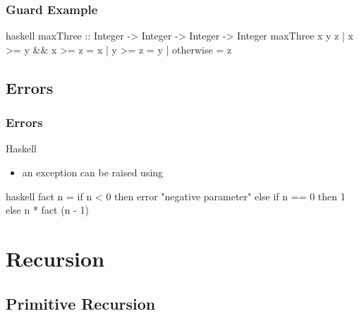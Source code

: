 \documentclass[dvipsnames]{beamer}
\theoremstyle{plain}
\begin{document}
\begin{frame}[fragile]
  \frametitle{Guard Example}

  \begin{exampleblock}{}
    \begin{pygments}{haskell}
maxThree :: Integer -> Integer -> Integer -> Integer
maxThree x y z
  | x >= y && x >= z    = x
  | y >= z              = y
  | otherwise           = z
    \end{pygments}
  \end{exampleblock}
\end{frame}

\subsection{Errors}

\begin{frame}[fragile]
  \frametitle{Errors}

  \begin{block}{Haskell}
    \begin{itemize}
      \item an exception can be raised using 
    \end{itemize}
  \end{block}

  \begin{example}[factorial]
    \begin{pygments}{haskell}
fact n =
    if n < 0
    then error "negative parameter"
    else if n == 0
         then 1
         else n * fact (n - 1)
    \end{pygments}
  \end{example}
\end{frame}

\section{Recursion}

\subsection{Primitive Recursion}
\end{document}
